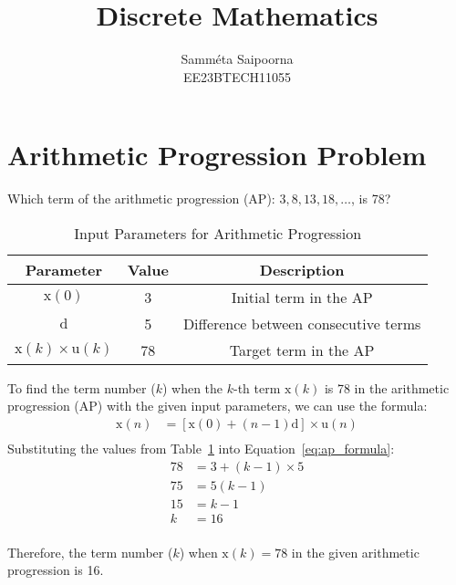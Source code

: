\documentclass[12pt]{article}
\title{Discrete Mathematics}
\author{Samméta Saipoorna\\ EE23BTECH11055}
\date{}
\begin{document}
\maketitle

\section{Arithmetic Progression Problem}
Which term of the arithmetic progression (AP): $3, 8, 13, 18, \ldots$, is 78?

\begin{table}[h]
    \centering
    \begin{tabular}{|c|c|c|}
        \hline
        \textbf{Parameter} & \textbf{Value} & \textbf{Description} \\
        \hline
        $\mathrm{x}(0)$ & 3 & Initial term in the AP \\
        \hline
        $\mathrm{d}$ & 5 & Difference between consecutive terms \\
        \hline
        $\mathrm{x}(k) \times \mathrm{u}(k)$ & 78 & Target term in the AP \\
        \hline
    \end{tabular}
    \caption{Input Parameters for Arithmetic Progression}
    \label{tab:input_parameters}
\end{table}

To find the term number ($k$) when the $k$-th term $\mathrm{x}(k)$ is 78 in the arithmetic progression (AP) with the given input parameters, we can use the formula:
\begin{align}
 \mathrm{x}(n) &= [\mathrm{x}(0) + (n-1)\mathrm{d}] \times \mathrm{u}(n) \label{eq:ap_formula} \\
\end{align}
Substituting the values from Table~\ref{tab:input_parameters} into Equation~\eqref{eq:ap_formula}:
\begin{align*}
 78 &= 3 + (k-1) \times 5 \\
 75 &= 5(k-1) \\
 15 &= k-1 \\
 k &= 16 \\
\end{align*}

Therefore, the term number ($k$) when $\mathrm{x}(k) = 78$ in the given arithmetic progression is 16.
\end{document}
